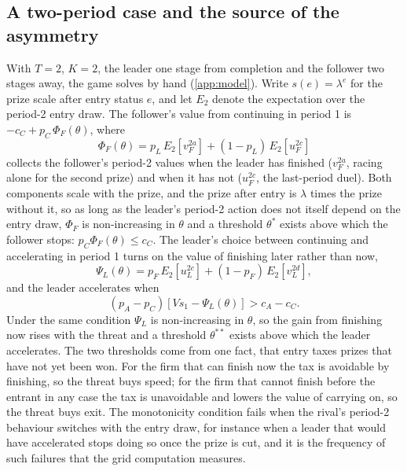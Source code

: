 \documentclass[preprint,12pt,authoryear]{elsarticle}
\begin{document}
\subsection{A two-period case and the source of the asymmetry}

With $T = 2$, $K = 2$, the leader one stage from completion and the follower two stages away, the game solves by hand (\ref{app:model}). Write $s(e) = \lambda^{e}$ for the prize scale after entry status $e$, and let $E_2$ denote the expectation over the period-2 entry draw. The follower's value from continuing in period 1 is $-c_C + p_C\,\Phi_F(\theta)$, where
\begin{equation}
\Phi_F(\theta) = p_L\, E_2\!\left[v_F^{2a}\right] + (1 - p_L)\, E_2\!\left[u_F^{2c}\right]
\label{eq:phi}
\end{equation}
collects the follower's period-2 values when the leader has finished ($v_F^{2a}$, racing alone for the second prize) and when it has not ($u_F^{2c}$, the last-period duel). Both components scale with the prize, and the prize after entry is $\lambda$ times the prize without it, so as long as the leader's period-2 action does not itself depend on the entry draw, $\Phi_F$ is non-increasing in $\theta$ and a threshold $\theta^{*}$ exists above which the follower stops: $p_C \Phi_F(\theta) \le c_C$. The leader's choice between continuing and accelerating in period 1 turns on the value of finishing later rather than now,
\begin{equation}
\Psi_L(\theta) = p_F\, E_2\!\left[u_L^{2c}\right] + (1 - p_F)\, E_2\!\left[v_L^{2d}\right],
\label{eq:psi}
\end{equation}
and the leader accelerates when
\begin{equation}
(p_A - p_C)\left[V s_1 - \Psi_L(\theta)\right] > c_A - c_C .
\label{eq:accel}
\end{equation} Under the same condition $\Psi_L$ is non-increasing in $\theta$, so the gain from finishing now rises with the threat and a threshold $\theta^{**}$ exists above which the leader accelerates. The two thresholds come from one fact, that entry taxes prizes that have not yet been won. For the firm that can finish now the tax is avoidable by finishing, so the threat buys speed; for the firm that cannot finish before the entrant in any case the tax is unavoidable and lowers the value of carrying on, so the threat buys exit. The monotonicity condition fails when the rival's period-2 behaviour switches with the entry draw, for instance when a leader that would have accelerated stops doing so once the prize is cut, and it is the frequency of such failures that the grid computation measures.
\end{document}
